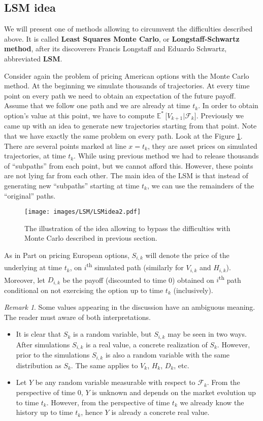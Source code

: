 \documentclass[a4paper,12pt, oneside]{book}
\theoremstyle{definition}
\theoremstyle{remark}
\newtheorem{remark}{Remark}[chapter]
\def\Em{{\mathbb{E}^*}\,}
\begin{document}
\subsection{LSM idea}
We will present one of methods allowing to circumvent the difficulties described above. It is called \textbf{Least Squares Monte Carlo}, or \textbf{Longstaff-Schwartz method}, after its discoverers Francis Longstaff and Eduardo Schwartz, abbreviated \textbf{LSM}.

Consider again the problem of pricing American options with the Monte Carlo method. At the beginning we simulate thousands of trajectories. At every time point on every path we need to obtain an expectation of the future payoff. Assume that we follow one path and we are already at time $t_k$. In order to obtain option's value at this point, we have to compute $\Em\bigl[ V_{k+1} | \mathcal{F}_{k} \bigr]$. Previously we came up with an idea to generate new trajectories starting from that point.
Note that we have exactly the same problem on every path. Look at the Figure \ref{fig:LSMidea}. There are several points marked at line $x = t_k$, they are asset prices on simulated trajectories, at time $t_k$. While using previous method we had to release thousands of ``subpaths'' from each point, but we cannot afford this. However, these points are not lying far from each other. The main idea of the LSM is that instead of generating new ``subpaths'' starting at time $t_k$, we can use the remainders of the ``original'' paths.

\begin{figure}[!ht]
\centering
 \texttt{[image: images/LSM/LSMidea2.pdf]}
\caption{The illustration of the idea allowing to bypass the difficulties with Monte Carlo described in previous section.}
\label{fig:LSMidea}
\end{figure}

As in Part on pricing European options, $S_{i,k}$ will denote the price of the underlying at time $t_k$, on $i$\textsuperscript{th} simulated path (similarly for $V_{i,k}$ and $H_{i,k}$). Moreover, let $D_{i,k}$ be the payoff (discounted to time 0) obtained on $i$\textsuperscript{th} path conditional on not exercising the option up to time $t_k$ (inclusively).
\begin{remark}
  Some values appearing in the discussion have an ambiguous meaning. The reader must aware of both interpretations.
 \begin{itemize}
  \item It is clear that $S_{k}$ is a random variable, but $S_{i,k}$ may be seen in two ways. After simulations $S_{i,k}$ is a real value, a concrete realization of $S_{k}$. However, prior to the simulations $S_{i,k}$ is also a random variable with the same distribution as $S_k$. The same applies to  $V_k$, $H_k$, $D_k$, etc.
  \item Let $Y$ be any random variable measurable with respect to $\mathcal{F}_k$. From the perspective of time 0, $Y$ is unknown and depends on the market evolution up to time $t_k$. However, from the perspective of time $t_k$ we already know the history up to time $t_k$, hence $Y$ is already a concrete real value.
 \end{itemize}
\end{remark}
\end{document}
